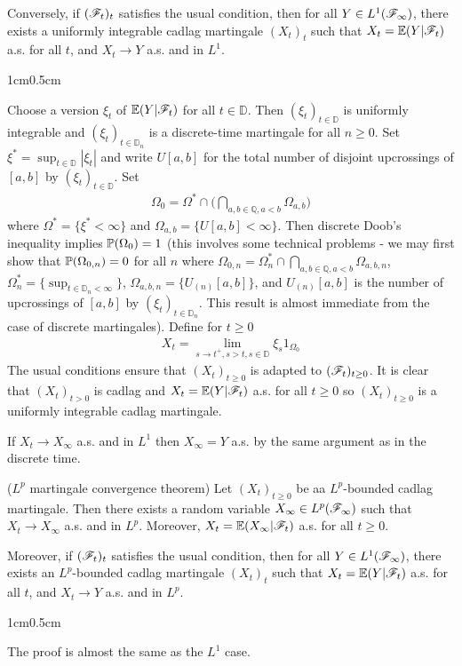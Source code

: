 \documentclass[10pt,a4paper]{report}
\newenvironment{proof}
{\begin{changemargin}{1cm}{0.5cm} 
	}%
	{\end{changemargin}
}
\begin{document}
\quad Conversely, if $(\mathscr{F}_t)_t$ satisfies the usual condition, then for all $Y\in L^1(\mathscr{F}_{\infty})$, there exists a uniformly integrable cadlag martingale $(X_t)_t$ such that $X_t = \mathbb{E}(Y|\mathscr{F}_t)$ a.s. for all $t$, and $X_t \rightarrow Y$ a.s. and in $L^1$.
\begin{proof}
\pf Choose a version $\xi_t$ of $\mathbb{E}(Y|\mathscr{F}_t)$ for all $t\in \mathbb{D}$. Then $(\xi_t)_{t \in \mathbb{D}}$ is uniformly integrable and $(\xi_t)_{t\in \mathbb{D}_n}$ is a discrete-time martingale for all $n\geq 0$. Set $\xi^* = \sup_{t\in \mathbb{D}} |\xi_t|$ and write $U[a,b]$ for the total number of disjoint upcrossings of $[a,b]$ by $(\xi_t)_{t\in \mathbb{D}}$. Set
\begin{align*}
\Omega_0 = \Omega^* \cap \Big(\bigcap_{a,b\in \mathbb{Q},a<b} \Omega_{a,b} \Big)
\end{align*} 
where $\Omega^* = \{ \xi^* <\infty \}$ and $\Omega_{a,b} =\{U[a,b] <\infty \}$. Then discrete Doob's inequality implies $\mathbb{P}(\Omega_0)=1$ (this involves some technical problems - we may first show that $\mathbb{P}(\Omega_{0,n}) =0$ for all $n$ where $\Omega_{0,n} = \Omega^*_n \cap \bigcap_{a,b\in \mathbb{Q},a<b} \Omega_{a,b,n}$, $\Omega^*_n = \{\sup_{t\in \mathbb{D}_n < \infty } \}$, $\Omega_{a,b,n} = \{ U_{(n)}[a,b]\}$, and $U_{(n)}[a,b]$ is the number of upcrossings of $[a,b]$ by $(\xi_t)_{t\in \mathbb{D}_n}$. This result is almost immediate from the case of discrete martingales). Define for $t\geq 0$
\begin{align*}
X_t = \lim_{s\rightarrow t^+, s>t,s\in \mathbb{D}} \xi_s 1_{\Omega_0} 
\end{align*}
The usual conditions ensure that $(X_t)_{t\geq 0}$ is adapted to $(\mathscr{F}_t)_{t\geq 0}$. It is clear that $(X_t)_{t>0}$ is cadlag and $X_t = \mathbb{E}(Y|\mathscr{F}_t)$ a.s. for all $t \geq 0$ so $(X_t)_{t\geq 0}$ is a uniformly integrable cadlag martingale.

\quad If $X_t \rightarrow X_{\infty}$ a.s. and in $L^1$ then $X_{\infty} = Y$ a.s. by the same argument as in the discrete time.

\eop
\end{proof}
\s

 ($L^p$ martingale convergence theorem) Let $(X_t)_{t\geq 0}$ be aa $L^p$-bounded cadlag martingale. Then there exists a random variable $X_{\infty} \in L^p(\mathscr{F}_{\infty})$ such that $X_t \rightarrow X_{\infty}$ a.s. and in $L^p$. Moreover, $X_t = \mathbb{E}(X_{\infty}|\mathscr{F}_t)$ a.s. for all $t\geq 0$.

\quad Moreover, if $(\mathscr{F}_t)_t$ satisfies the usual condition, then for all $Y\in L^1(\mathscr{F}_{\infty})$, there exists an $L^p$-bounded cadlag martingale $(X_t)_t$ such that $X_t = \mathbb{E}(Y|\mathscr{F}_t)$ a.s. for all $t$, and $X_t \rightarrow Y$ a.s. and in $L^p$.
\begin{proof}
\pf The proof is almost the same as the $L^1$ case.

\eop
\end{proof}
\s
\end{document}
